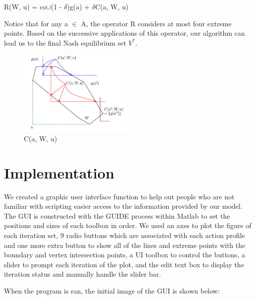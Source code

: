 \documentclass{article}
\begin{document}
	
\begin{center}
	R(W, u) = co$\cup$(1 - $\delta$)g(a) + $\delta$C(a, W, u)
\end{center}
	
	Notice that for any a $\in$ A, the operator R considers at most four extreme points. Based on the successive applications of this operator, our algorithm can lead us to the final Nash equilibrium set $V^*$. 
	

\begin{figure}[htb]

\begin{minipage}[b]{1.0\linewidth}
  \centering
  \centerline{\includegraphics[width=5.5cm]{roperator}}
\caption{C(a, W, u)}
\label{fig:res}
\end{minipage}
\end{figure}

\section{Implementation}
\label{implement}
We created a graphic user interface function to help out people who are not familiar with scripting easier access to the information provided by our model. The GUI is constructed with the GUIDE process within Matlab to set the positions and sizes of each toolbox in order. We used an axes to plot the figure of each iteration set, 9 radio buttons which are associated with each action profile and one more extra button to show all of the lines and extreme points with the boundary and vertex intersection points, a UI toolbox to control the buttons, a slider to prompt each iteration of the plot, and the edit text box to display the iteration status and manually handle the slider bar. 

When the program is ran, the initial image of the GUI is shown below:
\end{document}

